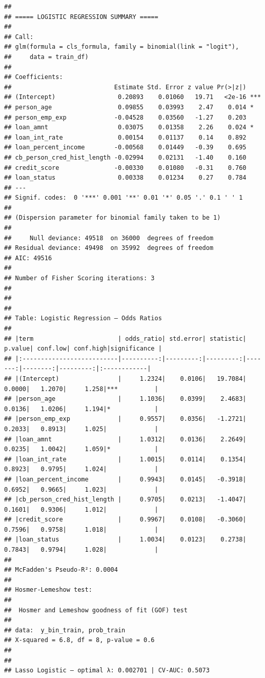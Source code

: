 \documentclass[
]{article}
\begin{document}
\begin{verbatim}
## 
## ===== LOGISTIC REGRESSION SUMMARY =====
## 
## Call:
## glm(formula = cls_formula, family = binomial(link = "logit"), 
##     data = train_df)
## 
## Coefficients:
##                            Estimate Std. Error z value Pr(>|z|)    
## (Intercept)                 0.20893    0.01060   19.71   <2e-16 ***
## person_age                  0.09855    0.03993    2.47    0.014 *  
## person_emp_exp             -0.04528    0.03560   -1.27    0.203    
## loan_amnt                   0.03075    0.01358    2.26    0.024 *  
## loan_int_rate               0.00154    0.01137    0.14    0.892    
## loan_percent_income        -0.00568    0.01449   -0.39    0.695    
## cb_person_cred_hist_length -0.02994    0.02131   -1.40    0.160    
## credit_score               -0.00330    0.01080   -0.31    0.760    
## loan_status                 0.00338    0.01234    0.27    0.784    
## ---
## Signif. codes:  0 '***' 0.001 '**' 0.01 '*' 0.05 '.' 0.1 ' ' 1
## 
## (Dispersion parameter for binomial family taken to be 1)
## 
##     Null deviance: 49518  on 36000  degrees of freedom
## Residual deviance: 49498  on 35992  degrees of freedom
## AIC: 49516
## 
## Number of Fisher Scoring iterations: 3
## 
## 
## 
## Table: Logistic Regression — Odds Ratios
## 
## |term                       | odds_ratio| std.error| statistic| p.value| conf.low| conf.high|significance |
## |:--------------------------|----------:|---------:|---------:|-------:|--------:|---------:|:------------|
## |(Intercept)                |     1.2324|    0.0106|   19.7084|  0.0000|   1.2070|     1.258|***          |
## |person_age                 |     1.1036|    0.0399|    2.4683|  0.0136|   1.0206|     1.194|*            |
## |person_emp_exp             |     0.9557|    0.0356|   -1.2721|  0.2033|   0.8913|     1.025|             |
## |loan_amnt                  |     1.0312|    0.0136|    2.2649|  0.0235|   1.0042|     1.059|*            |
## |loan_int_rate              |     1.0015|    0.0114|    0.1354|  0.8923|   0.9795|     1.024|             |
## |loan_percent_income        |     0.9943|    0.0145|   -0.3918|  0.6952|   0.9665|     1.023|             |
## |cb_person_cred_hist_length |     0.9705|    0.0213|   -1.4047|  0.1601|   0.9306|     1.012|             |
## |credit_score               |     0.9967|    0.0108|   -0.3060|  0.7596|   0.9758|     1.018|             |
## |loan_status                |     1.0034|    0.0123|    0.2738|  0.7843|   0.9794|     1.028|             |
## 
## McFadden's Pseudo-R²: 0.0004
## 
## Hosmer-Lemeshow test:
## 
##  Hosmer and Lemeshow goodness of fit (GOF) test
## 
## data:  y_bin_train, prob_train
## X-squared = 6.8, df = 8, p-value = 0.6
## 
## 
## Lasso Logistic — optimal λ: 0.002701 | CV-AUC: 0.5073
\end{verbatim}
\end{document}
